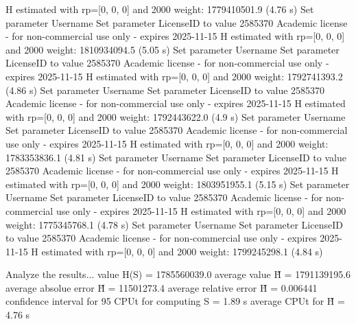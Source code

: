   H estimated with rp=[0, 0, 0] and 2000 weight:  1779410501.9  (4.76 s)
Set parameter Username
Set parameter LicenseID to value 2585370
Academic license - for non-commercial use only - expires 2025-11-15
  H estimated with rp=[0, 0, 0] and 2000 weight:  1810934094.5  (5.05 s)
Set parameter Username
Set parameter LicenseID to value 2585370
Academic license - for non-commercial use only - expires 2025-11-15
  H estimated with rp=[0, 0, 0] and 2000 weight:  1792741393.2  (4.86 s)
Set parameter Username
Set parameter LicenseID to value 2585370
Academic license - for non-commercial use only - expires 2025-11-15
  H estimated with rp=[0, 0, 0] and 2000 weight:  1792443622.0  (4.9 s)
Set parameter Username
Set parameter LicenseID to value 2585370
Academic license - for non-commercial use only - expires 2025-11-15
  H estimated with rp=[0, 0, 0] and 2000 weight:  1783353836.1  (4.81 s)
Set parameter Username
Set parameter LicenseID to value 2585370
Academic license - for non-commercial use only - expires 2025-11-15
  H estimated with rp=[0, 0, 0] and 2000 weight:  1803951955.1  (5.15 s)
Set parameter Username
Set parameter LicenseID to value 2585370
Academic license - for non-commercial use only - expires 2025-11-15
  H estimated with rp=[0, 0, 0] and 2000 weight:  1775345768.1  (4.78 s)
Set parameter Username
Set parameter LicenseID to value 2585370
Academic license - for non-commercial use only - expires 2025-11-15
  H estimated with rp=[0, 0, 0] and 2000 weight:  1799245298.1  (4.84 s)

Analyze the results...
  value H(S)                  = 1785560039.0 
  average value H̃             = 1791139195.6 
  average absolue error H̃     = 11501273.4 
  average relative error H̃    = 0.006441 
  confidence interval for 95%
  CPUt for computing S         = 1.89 s
  average CPUt for H̃           = 4.76 s

